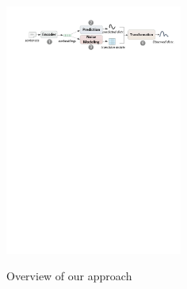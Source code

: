 



\begin{figure}[t!]
\begin{center}
\includegraphics[width=0.52\textwidth]{figures/overview.pdf}
\setlength{\belowcaptionskip}{-10pt}
\vspace{-5mm}	
\caption{Overview of our approach}
\vspace{-2mm}
\label{fig: denoise_framework}
\end{center}
\end{figure}


